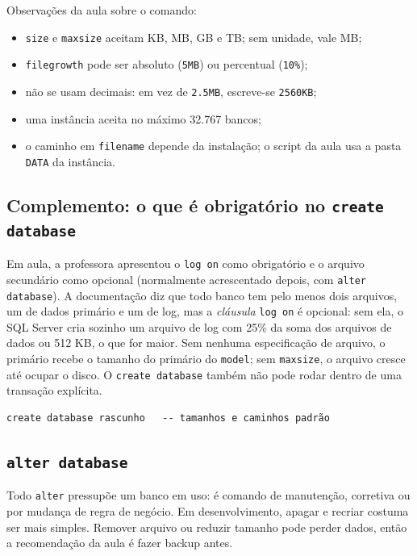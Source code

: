 Observações da aula sobre o comando:

\begin{itemize}
	\item \texttt{size} e \texttt{maxsize} aceitam KB, MB, GB e TB; sem
	unidade, vale MB;
	\item \texttt{filegrowth} pode ser absoluto (\texttt{5MB}) ou
	percentual (\texttt{10\%});
	\item não se usam decimais: em vez de \texttt{2.5MB}, escreve-se
	\texttt{2560KB};
	\item uma instância aceita no máximo 32.767 bancos;
	\item o caminho em \texttt{filename} depende da instalação; o script
	da aula usa a pasta \texttt{DATA} da instância.
\end{itemize}

\subsection*{Complemento: o que é obrigatório no \texttt{create database}}

Em aula, a professora apresentou o \texttt{log on} como obrigatório e o
arquivo secundário como opcional (normalmente acrescentado depois, com
\texttt{alter database}). A documentação diz
que todo banco tem pelo menos dois arquivos, um de dados primário e um
de log, mas a \emph{cláusula} \texttt{log on} é opcional: sem ela, o SQL
Server cria sozinho um arquivo de log com 25\% da soma dos arquivos de
dados ou 512 KB, o que for maior. Sem nenhuma especificação de arquivo,
o primário recebe o tamanho do primário do \texttt{model}; sem
\texttt{maxsize}, o arquivo cresce até ocupar o disco. O
\texttt{create database} também não pode rodar dentro de uma transação
explícita.

\begin{lstlisting}
create database rascunho   -- tamanhos e caminhos padrão
\end{lstlisting}

\subsection{\texttt{alter database}}

Todo \texttt{alter} pressupõe um banco em uso: é comando de manutenção,
corretiva ou por mudança de regra de negócio. Em desenvolvimento, apagar
e recriar costuma ser mais simples. Remover arquivo ou reduzir tamanho
pode perder dados, então a recomendação da aula é fazer backup antes.

